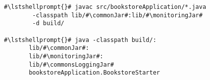 \begin{lstlisting}[caption=Command to compile and run the instrumented Bookstore under Linux]
#\lstshellprompt{}# javac src/bookstoreApplication/*.java
        -classpath lib/#\commonJar#:lib/#\monitoringJar#
        -d build/

#\lstshellprompt{}# java -classpath build/:
       lib/#\commonJar#:
       lib/#\monitoringJar#:
       lib/#\commonsLoggingJar#
       bookstoreApplication.BookstoreStarter 
\end{lstlisting}
